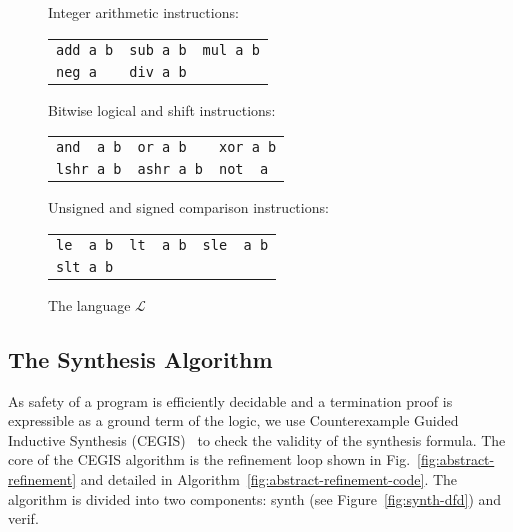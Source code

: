 \begin{figure}
{\small
\begin{center}
\setlength{\tabcolsep}{16pt}
Integer arithmetic instructions:

\begin{tabular}{lll}
 \verb|add a b| & \verb|sub a b| & \verb|mul a b| \\
 \verb|neg a| & \verb|div a b|  & 
\end{tabular}

\medskip

Bitwise logical and shift instructions:

\begin{tabular}{lll}
 \verb|and  a b| & \verb|or a b| & \verb|xor a b| \\
 \verb|lshr a b| & \verb|ashr a b| & \verb|not  a| 
\end{tabular}

\medskip

Unsigned and signed comparison instructions:

\begin{tabular}{lll}
 \verb|le  a b| & \verb|lt  a b| & \verb|sle  a b| \\
 \verb|slt a b| & &
\end{tabular}
\end{center}
}
 \caption{The language $\mathcal{L}$}
 \label{fig:l-language}
\end{figure}


\subsection{The Synthesis Algorithm}
As safety of a \newC program is efficiently 
decidable and a termination proof is expressible as a ground term of the \newC logic, we use
Counterexample Guided Inductive Synthesis (CEGIS)~\cite{lezama-thesis,sketch} to
check the validity of the synthesis formula. 
The core of the CEGIS algorithm is the refinement loop shown in Fig.~\ref{fig:abstract-refinement} and
detailed in Algorithm~\ref{fig:abstract-refinement-code}.  
The algorithm is divided into two
components: {\sc synth} (see Figure~\ref{fig:synth-dfd}) and {\sc verif}.%

